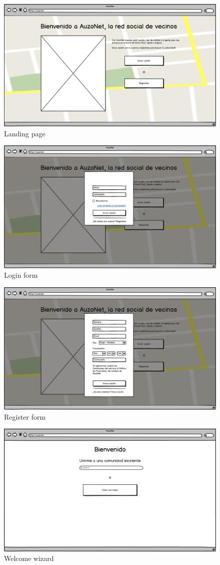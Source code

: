 \documentclass{DeustoFDP}
\begin{document}
\begin{figure}[h]
\centering
\includegraphics[width=0.7\linewidth]{fig/mockups/landing2}
\caption[Landing page]{Landing page}
\label{fig:landing2}
\end{figure}

\begin{figure}[h]
\centering
\includegraphics[width=0.7\linewidth]{fig/mockups/landing}
\caption[Login form]{Login form}
\label{fig:landing}
\end{figure}

\begin{figure}[h]
\centering
\includegraphics[width=0.7\linewidth]{fig/mockups/register}
\caption[Register form]{Register form}
\label{fig:register}
\end{figure}

\begin{figure}[h]
	\centering
	\includegraphics[width=0.7\linewidth]{fig/mockups/wizard}
	\caption[Welcome wizard]{Welcome wizard}
	\label{fig:wizard}
\end{figure}
\end{document}
